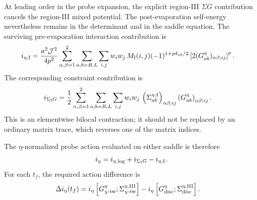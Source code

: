 \documentclass[11pt,a4paper]{article}
\begin{document}
At leading order in the probe expansion, the explicit region-III
\(\Sigma G\) contribution cancels the region-III mixed potential. The
post-evaporation self-energy nevertheless remains in the determinant and in
the saddle equation. The surviving pre-evaporation interaction contribution
is
\begin{equation}
\begin{aligned}
  i_{\eta,\rm I}
  &=
  \frac{a^2\mathcal J^2}{4p^2}
  \sum_{\alpha,\beta=1}^{2}
  \sum_{a,b=R,L}
  \sum_{i,j}
  w_iw_j\,
  M_{\rm I}(i,j)
  (-1)^{1+p\delta_{ab}/2}
  \left[
  2(G^\eta_{ab})_{\alpha\beta;ij}
  \right]^p .
\end{aligned}
\label{eq:S5-early-interaction-action}
\end{equation}
The corresponding constraint contribution is
\begin{equation}
\begin{aligned}
  i_{\Sigma_{\rm I}G}
  &=
  \frac{1}{2}
  \sum_{\alpha,\beta=1}^{2}
  \sum_{a,b=R,L}
  \sum_{i,j}
  w_iw_j\,
  \left(
  \Sigma^{\eta,\rm I}_{ab}
  \right)_{\alpha\beta;ij}
  \left(
  G^\eta_{ab}
  \right)_{\alpha\beta;ij}.
\end{aligned}
\label{eq:S5-SigmaG-action}
\end{equation}
This is an elementwise bilocal contraction; it should not be replaced by an
ordinary matrix trace, which reverses one of the matrix indices.

The \(\eta\)-normalized probe action evaluated on either saddle is therefore
\begin{equation}
  i_\eta
  =
  i_{\eta,\log}
  +
  i_{\Sigma_{\rm I}G}
  -
  i_{\eta,\rm I}.
\label{eq:S5-probe-action}
\end{equation}
For each \(t_f\), the required action difference is
\begin{equation}
\begin{aligned}
  \Delta i_\eta(t_f)
  &=
  i_\eta
  \left[
  G^\eta_{\chi\text{-tw}};
  \Sigma^{\eta,\rm III}_{\chi\text{-tw}}
  \right]
  -
  i_\eta
  \left[
  G^\eta_{\rm disc};
  \Sigma^{\eta,\rm III}_{\rm disc}
  \right].
\end{aligned}
\label{eq:S5-final-action-difference}
\end{equation}
\end{document}
